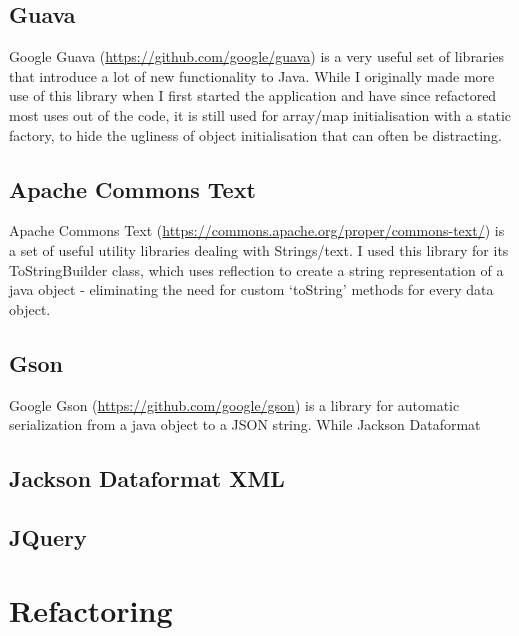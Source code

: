 \documentclass[12pt]{article}
\begin{document}
  \subsection{Guava}
    Google Guava (\url{https://github.com/google/guava}) is a very useful set of libraries that introduce a lot of new functionality to Java. While I originally made more use of this library when I first started the application and have since refactored most uses out of the code, it is still used for array/map initialisation with a static factory, to hide the ugliness of object initialisation that can often be distracting.

  \subsection{Apache Commons Text}
    Apache Commons Text (\url{https://commons.apache.org/proper/commons-text/}) is a set of useful utility libraries dealing with Strings/text. I used this library for its ToStringBuilder class, which uses reflection to create a string representation of a java object - eliminating the need for custom ‘toString’ methods for every data object.

  \subsection{Gson}
    Google Gson (\url{https://github.com/google/gson}) is a library for automatic serialization from a java object to a JSON string. While Jackson Dataformat

  \subsection{Jackson Dataformat XML}

  \subsection{JQuery}


\section{Refactoring}

\newpage



\end{document}
